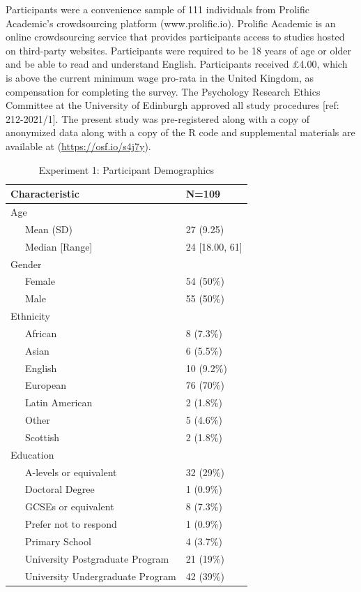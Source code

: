\documentclass[
  donotrepeattitle,doc, 12pt, a4paper,floatsintext]{apa7}
\begin{document}
Participants were a convenience sample of 111 individuals from Prolific Academic's crowdsourcing platform (www.prolific.io). Prolific Academic is an online crowdsourcing service that provides participants access to studies hosted on third-party websites. Participants were required to be 18 years of age or older and be able to read and understand English. Participants received £4.00, which is above the current minimum wage pro-rata in the United Kingdom, as compensation for completing the survey. The Psychology Research Ethics Committee at the University of Edinburgh approved all study procedures {[}ref: 212-2021/1{]}. The present study was pre-registered along with a copy of anonymized data along with a copy of the R code and supplemental materials are available at (\url{https://osf.io/s4j7y}).

\begin{table}[ht]

\begin{center}
\begin{threeparttable}

\caption{\label{tab:demographicTableExperiment1}Experiment 1: Participant Demographics}

\begin{tabular}{ll}
\toprule
Characteristic & N=109\\
\midrule
Age & \\
\ \ \ Mean (SD) & 27 (9.25)\\
\ \ \ Median [Range] & 24 [18.00, 61]\\
Gender & \\
\ \ \ Female & 54 (50\%)\\
\ \ \ Male & 55 (50\%)\\
Ethnicity & \\
\ \ \ African & 8 (7.3\%)\\
\ \ \ Asian & 6 (5.5\%)\\
\ \ \ English & 10 (9.2\%)\\
\ \ \ European & 76 (70\%)\\
\ \ \ Latin American & 2 (1.8\%)\\
\ \ \ Other & 5 (4.6\%)\\
\ \ \ Scottish & 2 (1.8\%)\\
Education & \\
\ \ \ A-levels or equivalent & 32 (29\%)\\
\ \ \ Doctoral Degree & 1 (0.9\%)\\
\ \ \ GCSEs or equivalent & 8 (7.3\%)\\
\ \ \ Prefer not to respond & 1 (0.9\%)\\
\ \ \ Primary School & 4 (3.7\%)\\
\ \ \ University Postgraduate Program & 21 (19\%)\\
\ \ \ University Undergraduate Program & 42 (39\%)\\
\bottomrule
\end{tabular}

\end{threeparttable}
\end{center}

\end{table}
\end{document}

